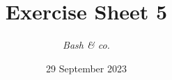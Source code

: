




\title{{\vspace{-12mm}\huge\textbf{Exercise Sheet 5}}}
\author{\textit{Bash \& co.}}
\date{{\small 29 September 2023}}


    \maketitle
    \bigskip
    
    \bigskip
    
    \bigskip
    
